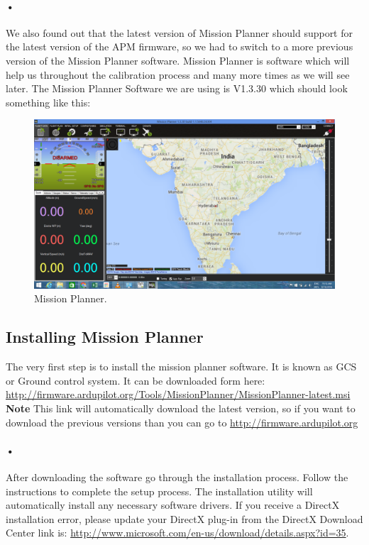 \documentclass[11pt,a4paper]{article}
\begin{document}
	 \paragraph{•}We also found out that the latest version of Mission Planner should support for the latest version of the APM firmware, so we had to switch to a more previous version of the Mission Planner software. Mission Planner is software which will help us throughout the calibration process and many more times as we will see later. The Mission Planner Software we are using is V1.3.30 which should look something like this: 
	 \begin{figure}[H]
	 	\centering
		\includegraphics[scale=0.35]{mission}
	 	\caption{Mission Planner.}
\end{figure}
	 \subsection{Installing Mission Planner}
	 The very first step is to install the mission planner software. It is known as GCS or Ground control system. It can be downloaded form here: \url{http://firmware.ardupilot.org/Tools/MissionPlanner/MissionPlanner-latest.msi} \textbf{Note} This link will automatically download the latest version, so if you want to download the previous versions than you can go to \url{http://firmware.ardupilot.org}
	 \paragraph{•}After downloading the software go through the installation process. Follow the instructions to complete the setup process. The installation utility will automatically install any necessary software drivers. If you receive a DirectX installation error, please update your DirectX plug-in from the DirectX Download Center link is: \url{http://www.microsoft.com/en-us/download/details.aspx?id=35}.
\end{document}
